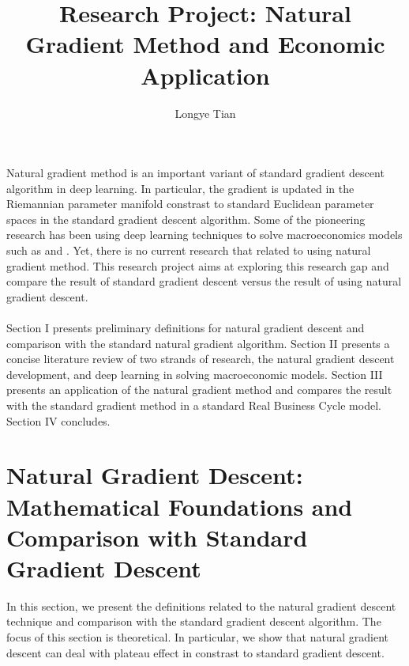 \documentclass[a4paper]{article}
\title{Research Project: Natural Gradient Method and Economic Application}
\author{Longye Tian}
\begin{document}
\maketitle

Natural gradient method is an important variant of standard gradient descent algorithm in deep learning. In particular, the gradient is updated in the Riemannian parameter manifold constrast to standard Euclidean parameter spaces in the standard gradient descent algorithm. Some of the pioneering research has been using deep learning techniques to solve macroeconomics models such as \cite{maliar2021deep} and \cite{beck2024deep}. Yet, there is no current research that related to using natural gradient method. This research project aims at exploring this research gap and compare the result of standard gradient descent versus the result of using natural gradient descent. \\
\\
Section I presents preliminary definitions for natural gradient descent and comparison with the standard natural gradient algorithm. Section II presents a concise literature review of two strands of research, the natural gradient descent development, and deep learning in solving macroeconomic models. Section III presents an application of the natural gradient method and compares the result with the standard gradient method in a standard Real Business Cycle model. Section IV concludes.
\section{Natural Gradient Descent: Mathematical Foundations and Comparison with Standard Gradient Descent}
In this section, we present the definitions related to the natural gradient descent technique and comparison with the standard gradient descent algorithm. The focus of this section is theoretical. In particular, we show that natural gradient descent can deal with plateau effect in constrast to standard gradient descent.
\end{document}
